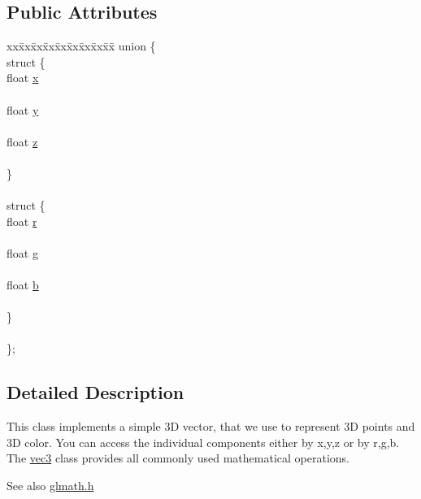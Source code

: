 \subsection*{Public Attributes}
\begin{DoxyCompactItemize}
\item 
\begin{tabbing}
xx\=xx\=xx\=xx\=xx\=xx\=xx\=xx\=xx\=\kill
union \{\\
\>struct \{\\
\>\>float \hyperlink{classvec3_a4ee2cfd5c2698031a47ab7f898d8d47b}{x}\\
\>\>\\
\>\>float \hyperlink{classvec3_a891379795a14c80936cde4170239a138}{y}\\
\>\>\\
\>\>float \hyperlink{classvec3_aa76213efcc5d656cc14b71db80a92162}{z}\\
\>\>\\
\>\} \\
\>\>\\
\>struct \{\\
\>\>float \hyperlink{classvec3_aad2a8afd4360cc9fd6689899b5c59fa4}{r}\\
\>\>\\
\>\>float \hyperlink{classvec3_a4f02b7765f76a7ea7265dcfd802d1eca}{g}\\
\>\>\\
\>\>float \hyperlink{classvec3_a4153d68b1b7932b554da91c1ee75d77c}{b}\\
\>\>\\
\>\} \\
\>\>\\
\}; \\

\end{tabbing}\end{DoxyCompactItemize}


\subsection{Detailed Description}
This class implements a simple 3D vector, that we use to represent 3D points and 3D color. You can access the individual components either by x,y,z or by r,g,b. The \hyperlink{classvec3}{vec3} class provides all commonly used mathematical operations. \begin{DoxySeeAlso}{See also}
\hyperlink{glmath_8h}{glmath.\+h} 
\end{DoxySeeAlso}


